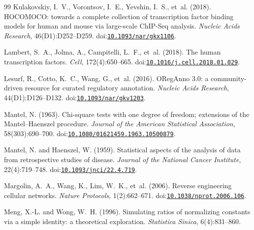 \documentclass[11pt,a4paper]{article}
\begin{document}
\begin{thebibliography}{99}
Kulakovskiy, I.~V., Vorontsov, I.~E., Yevshin, I.~S., et~al. (2018).
\newblock HOCOMOCO: towards a complete collection of transcription factor binding models for human and mouse via large-scale ChIP-Seq analysis.
\newblock \emph{Nucleic Acids Research}, 46(D1):D252--D259.
\newblock doi:\href{https://doi.org/10.1093/nar/gkx1106}{\nolinkurl{10.1093/nar/gkx1106}}.

Lambert, S.~A., Jolma, A., Campitelli, L.~F., et~al. (2018).
\newblock The human transcription factors.
\newblock \emph{Cell}, 172(4):650--665.
\newblock doi:\href{https://doi.org/10.1016/j.cell.2018.01.029}{\nolinkurl{10.1016/j.cell.2018.01.029}}.

Lesurf, R., Cotto, K.~C., Wang, G., et~al. (2016).
\newblock ORegAnno 3.0: a community-driven resource for curated regulatory annotation.
\newblock \emph{Nucleic Acids Research}, 44(D1):D126--D132.
\newblock doi:\href{https://doi.org/10.1093/nar/gkv1203}{\nolinkurl{10.1093/nar/gkv1203}}.

Mantel, N. (1963).
\newblock Chi-square tests with one degree of freedom; extensions of the {Mantel--Haenszel} procedure.
\newblock \emph{Journal of the American Statistical Association}, 58(303):690--700.
\newblock doi:\href{https://doi.org/10.1080/01621459.1963.10500879}{\nolinkurl{10.1080/01621459.1963.10500879}}.

Mantel, N. and Haenszel, W. (1959).
\newblock Statistical aspects of the analysis of data from retrospective studies of disease.
\newblock \emph{Journal of the National Cancer Institute}, 22(4):719--748.
\newblock doi:\href{https://doi.org/10.1093/jnci/22.4.719}{\nolinkurl{10.1093/jnci/22.4.719}}.

Margolin, A.~A., Wang, K., Lim, W.~K., et~al. (2006).
\newblock Reverse engineering cellular networks.
\newblock \emph{Nature Protocols}, 1(2):662--671.
\newblock doi:\href{https://doi.org/10.1038/nprot.2006.106}{\nolinkurl{10.1038/nprot.2006.106}}.

Meng, X.-L. and Wong, W.~H. (1996).
\newblock Simulating ratios of normalizing constants via a simple identity: a theoretical exploration.
\newblock \emph{Statistica Sinica}, 6(4):831--860.


\end{thebibliography}
\end{document}
